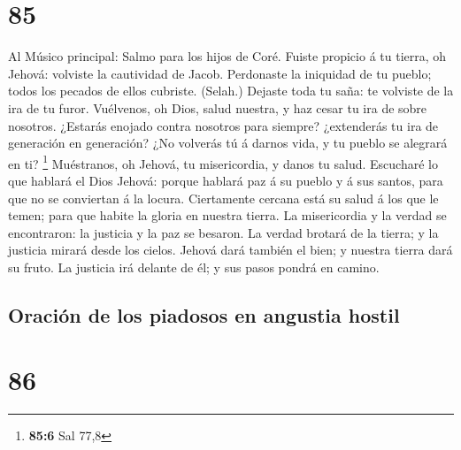 \hypertarget{section-84}{%
\section{85}\label{section-84}}

 Al Músico principal: Salmo para los hijos de Coré. Fuiste
propicio á tu tierra, oh Jehová: volviste la cautividad de Jacob.
 Perdonaste la iniquidad de tu pueblo; todos los pecados de
ellos cubriste. (Selah.)  Dejaste toda tu saña: te volviste
de la ira de tu furor.  Vuélvenos, oh Dios, salud nuestra, y
haz cesar tu ira de sobre nosotros.  ¿Estarás enojado contra
nosotros para siempre? ¿extenderás tu ira de generación en generación?
 ¿No volverás tú á darnos vida, y tu pueblo se alegrará en
ti? \footnote{\textbf{85:6} Sal 77,8}  Muéstranos, oh
Jehová, tu misericordia, y danos tu salud.  Escucharé lo que
hablará el Dios Jehová: porque hablará paz á su pueblo y á sus santos,
para que no se conviertan á la locura.  Ciertamente cercana
está su salud á los que le temen; para que habite la gloria en nuestra
tierra.  La misericordia y la verdad se encontraron: la
justicia y la paz se besaron.  La verdad brotará de la
tierra; y la justicia mirará desde los cielos.  Jehová dará
también el bien; y nuestra tierra dará su fruto.  La
justicia irá delante de él; y sus pasos pondrá en camino.

\hypertarget{oraciuxf3n-de-los-piadosos-en-angustia-hostil}{%
\subsection{Oración de los piadosos en angustia
hostil}\label{oraciuxf3n-de-los-piadosos-en-angustia-hostil}}

\hypertarget{section-85}{%
\section{86}\label{section-85}}

